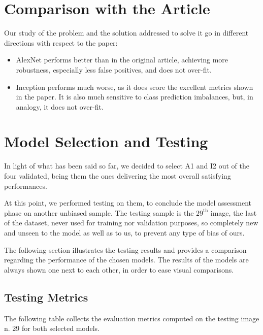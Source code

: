 \section{Comparison with the Article}

Our study of the problem and the solution addressed to solve it go in different directions with respect to the paper:

\begin{itemize}
    \item AlexNet performs better than in the original article, achieving more robustness, especially less false positives, and does not over-fit.
    \item Inception  performs much worse, as it does score the excellent metrics shown in the paper. It is also much sensitive to class prediction imbalances, but, in analogy, it does not over-fit.
\end{itemize}

\section{Model Selection and Testing}

\par
In light of what has been said so far, we decided to select A1 and I2 out of the four validated, being them the ones delivering the most overall satisfying performances.

\par
At this point, we performed testing on them, to conclude the model assessment phase on another unbiased sample. The testing sample is the $29^{\text{th}}$ image, the last of the dataset, never used for training nor validation purposes, so completely new and unseen to the model as well as to us, to prevent any type of bias of ours.

\par
The following section illustrates the testing results and provides a comparison regarding the performance of the chosen models. The results of the models are always shown one next to each other, in order to ease visual comparisons.

\subsection{Testing Metrics}

\par
The following table collects the evaluation metrics computed on the testing image n. 29 for both selected models.

